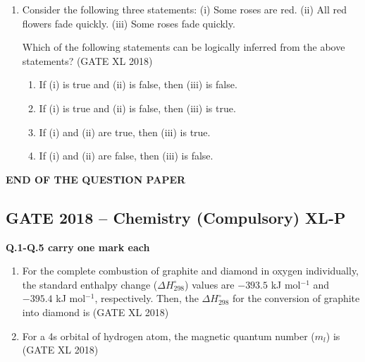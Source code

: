 \documentclass[14pt]{extarticle}
\begin{document}
\begin{flushleft}
\begin{enumerate}
\item Consider the following three statements:  
    (i) Some roses are red.  
    (ii) All red flowers fade quickly.  
    (iii) Some roses fade quickly.  

Which of the following statements can be logically inferred from the above statements?
\hfill(GATE XL 2018)\\
\begin{enumerate}
\item If (i) is true and (ii) is false, then (iii) is false.
\item If (i) is true and (ii) is false, then (iii) is true.
\item If (i) and (ii) are true, then (iii) is true.
\item If (i) and (ii) are false, then (iii) is false.
    \end{enumerate}
\end{enumerate}
\begin{center}
    \textbf{END OF THE QUESTION PAPER}
\end{center}
\clearpage

\begin{center}
\section*{GATE 2018 – Chemistry (Compulsory) XL-P}
\end{center}
\textbf{Q.1-Q.5 carry one mark each}

\begin{enumerate}
\item For the complete combustion of graphite and diamond in oxygen individually, the standard enthalpy change ($\Delta H^\circ_{298}$) values are $-393.5$ kJ mol$^{-1}$ and $-395.4$ kJ mol$^{-1}$, respectively. Then, the $\Delta H^\circ_{298}$ for the conversion of graphite into diamond is \hfill (GATE XL 2018)\\
\begin{enumerate}
\end{enumerate}
\item For a 4s orbital of hydrogen atom, the magnetic quantum number ($m_l$) is\\
\hfill (GATE XL 2018)
\begin{enumerate}
\end{enumerate}


\end{enumerate}
\end{flushleft}
\end{document}

